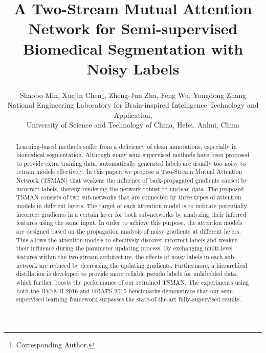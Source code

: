 \documentclass[letterpaper]{article} %
\begin{document}
%
\title{A Two-Stream Mutual Attention Network for Semi-supervised Biomedical Segmentation with Noisy Labels}
\author{Shaobo Min, Xuejin Chen\thanks{Corresponding Author.}, Zheng-Jun Zha, Feng Wu, Yongdong Zhang\\
National Engineering Laboratory for Brain-inspired Intelligence Technology and Application,\\
University of Science and Technology of China, Hefei, Anhui, China\\ %
}
\maketitle
\begin{abstract}
Learning-based methods suffer from a deficiency of clean annotations, especially in biomedical segmentation.
Although many semi-supervised methods have been proposed to provide extra training data, automatically generated labels are usually too noisy to retrain models effectively.
In this paper, we propose a Two-Stream Mutual Attention Network (TSMAN) that weakens the influence of back-propagated gradients caused by incorrect labels, thereby rendering the network robust to unclean data.
The proposed TSMAN consists of two sub-networks that are connected by three types of attention models in different layers.
The target of each attention model is to indicate potentially incorrect gradients in a certain layer for both sub-networks by analyzing their inferred features using the same input.
In order to achieve this purpose, the attention models are designed based on the propagation analysis of noisy gradients at different layers. This allows the attention models to effectively discover incorrect labels and weaken their influence during the parameter updating process.
By exchanging multi-level features within the two-stream architecture, the effects of noisy labels in each sub-network are reduced by decreasing the updating gradients.
Furthermore, a hierarchical distillation is developed to provide more reliable pseudo labels for unlabelded data, which further boosts the performance of our retrained TSMAN.
The experiments using both the HVSMR 2016 and BRATS 2015 benchmarks demonstrate that our semi-supervised learning framework surpasses the state-of-the-art fully-supervised results. 
\end{abstract}
\end{document}
